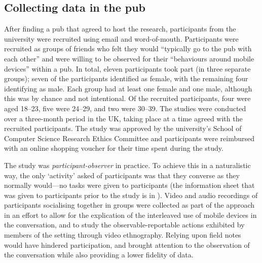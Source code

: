 \subsection{Collecting data in the pub}\label{sec:empirical pub design fieldwork}
After finding a pub that agreed to host the research, participants from the university were recruited using email and word-of-mouth.
Participants were recruited as groups of friends who felt they would ``typically go to the pub with each other'' and were willing to be observed for their ``behaviours around mobile devices'' within a pub.
In total, eleven participants took part (in three separate groups); seven of the participants identified as female, with the remaining four identifying as male.
Each group had at least one female and one male, although this was by chance and not intentional.
Of the recruited participants, four were aged 18--23, five were 24--29, and two were 30--39.
The studies were conducted over a three-month period in the UK, taking place at a time agreed with the recruited participants.
The study was approved by the university's School of Computer Science Research Ethics Committee and participants were reimbursed with an online shopping voucher for their time spent during the study.

The study was \textit{participant-observer} in practice.
To achieve this in a naturalistic way, the only `activity' asked of participants was that they converse as they normally would---no tasks were given to participants (the information sheet that was given to participants prior to the study is in ).
Video and audio recordings of participants socialising together in groups were collected as part of the approach in an effort to allow for the explication of the interleaved use of mobile devices in the conversation, and to study the observable-reportable actions exhibited by members of the setting through video ethnography.
Relying upon field notes would have hindered participation, and brought attention to the observation of the conversation while also providing a lower fidelity of data.

